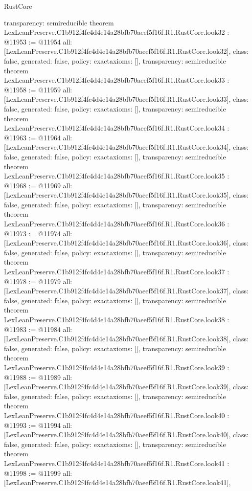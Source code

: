 \begin{lexlean}{RustCore}
\begin{coremodule}
{  transparency: semireducible
}
theorem LexLeanPreserve.C1b912f4fc4d4e14a28bfb70aeef5f16f.R1.RustCore.look32 : @11953 := @11954 {
  all: [LexLeanPreserve.C1b912f4fc4d4e14a28bfb70aeef5f16f.R1.RustCore.look32],
  class: false,
  generated: false,
  policy: exact{axioms: []},
  transparency: semireducible
}
theorem LexLeanPreserve.C1b912f4fc4d4e14a28bfb70aeef5f16f.R1.RustCore.look33 : @11958 := @11959 {
  all: [LexLeanPreserve.C1b912f4fc4d4e14a28bfb70aeef5f16f.R1.RustCore.look33],
  class: false,
  generated: false,
  policy: exact{axioms: []},
  transparency: semireducible
}
theorem LexLeanPreserve.C1b912f4fc4d4e14a28bfb70aeef5f16f.R1.RustCore.look34 : @11963 := @11964 {
  all: [LexLeanPreserve.C1b912f4fc4d4e14a28bfb70aeef5f16f.R1.RustCore.look34],
  class: false,
  generated: false,
  policy: exact{axioms: []},
  transparency: semireducible
}
theorem LexLeanPreserve.C1b912f4fc4d4e14a28bfb70aeef5f16f.R1.RustCore.look35 : @11968 := @11969 {
  all: [LexLeanPreserve.C1b912f4fc4d4e14a28bfb70aeef5f16f.R1.RustCore.look35],
  class: false,
  generated: false,
  policy: exact{axioms: []},
  transparency: semireducible
}
theorem LexLeanPreserve.C1b912f4fc4d4e14a28bfb70aeef5f16f.R1.RustCore.look36 : @11973 := @11974 {
  all: [LexLeanPreserve.C1b912f4fc4d4e14a28bfb70aeef5f16f.R1.RustCore.look36],
  class: false,
  generated: false,
  policy: exact{axioms: []},
  transparency: semireducible
}
theorem LexLeanPreserve.C1b912f4fc4d4e14a28bfb70aeef5f16f.R1.RustCore.look37 : @11978 := @11979 {
  all: [LexLeanPreserve.C1b912f4fc4d4e14a28bfb70aeef5f16f.R1.RustCore.look37],
  class: false,
  generated: false,
  policy: exact{axioms: []},
  transparency: semireducible
}
theorem LexLeanPreserve.C1b912f4fc4d4e14a28bfb70aeef5f16f.R1.RustCore.look38 : @11983 := @11984 {
  all: [LexLeanPreserve.C1b912f4fc4d4e14a28bfb70aeef5f16f.R1.RustCore.look38],
  class: false,
  generated: false,
  policy: exact{axioms: []},
  transparency: semireducible
}
theorem LexLeanPreserve.C1b912f4fc4d4e14a28bfb70aeef5f16f.R1.RustCore.look39 : @11988 := @11989 {
  all: [LexLeanPreserve.C1b912f4fc4d4e14a28bfb70aeef5f16f.R1.RustCore.look39],
  class: false,
  generated: false,
  policy: exact{axioms: []},
  transparency: semireducible
}
theorem LexLeanPreserve.C1b912f4fc4d4e14a28bfb70aeef5f16f.R1.RustCore.look40 : @11993 := @11994 {
  all: [LexLeanPreserve.C1b912f4fc4d4e14a28bfb70aeef5f16f.R1.RustCore.look40],
  class: false,
  generated: false,
  policy: exact{axioms: []},
  transparency: semireducible
}
theorem LexLeanPreserve.C1b912f4fc4d4e14a28bfb70aeef5f16f.R1.RustCore.look41 : @11998 := @11999 {
  all: [LexLeanPreserve.C1b912f4fc4d4e14a28bfb70aeef5f16f.R1.RustCore.look41],
}
\end{coremodule}
\end{lexlean}
